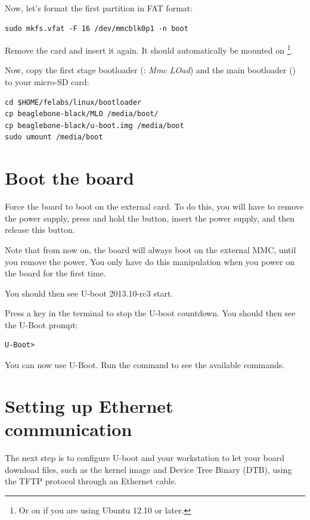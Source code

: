 Now, let's format the first partition in FAT format:

\begin{verbatim}
sudo mkfs.vfat -F 16 /dev/mmcblk0p1 -n boot
\end{verbatim}

Remove the card and insert it again. It should automatically be mounted
on  \footnote{Or on  if you
are using Ubuntu 12.10 or later.}.

Now, copy the first stage bootloader (: {\em Mmc LOad}) and the main
bootloader () to your micro-SD card:

\begin{verbatim}
cd $HOME/felabs/linux/bootloader
cp beaglebone-black/MLO /media/boot/
cp beaglebone-black/u-boot.img /media/boot
sudo umount /media/boot
\end{verbatim}

\section{Boot the board}

Force the board to boot on the external card. To do this, you will
have to remove the power supply, press and hold the 
button, insert the power supply, and then release this button.

Note that from now on, the board will always boot on the external 
MMC, until you remove the power. You only have do this manipulation
when you power on the board for the first time.

You should then see U-boot 2013.10-rc3 start.

Press a key in the  terminal to stop the U-boot
countdown. You should then see the U-Boot prompt:
\begin{verbatim}
U-Boot>
\end{verbatim}

You can now use U-Boot. Run the  command to see the available
commands.

\section{Setting up Ethernet communication}

The next step is to configure U-boot and your workstation to let your
board download files, such as the kernel image and Device Tree Binary
(DTB), using the TFTP protocol through an Ethernet cable.

